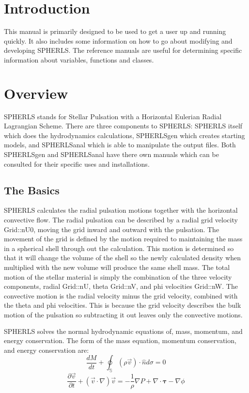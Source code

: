 \documentclass[11pt]{article}
\begin{document}
\section{Introduction}

This manual is primarily designed to be used to get a user up and running quickly. It also includes some information on how to go about modifying and developing SPHERLS. The reference manuals are useful for determining specific information about variables, functions and classes.

\section{Overview}
SPHERLS stands for Stellar Pulsation with a Horizontal Eulerian Radial Lagrangian Scheme. There are three components to SPHERLS: SPHERLS itself which does the hydrodynamics calculations, SPHERLSgen which creates starting models, and SPHERLSanal which is able to manipulate the output files. Both SPHERLSgen and SPHERLSanal have there own manuals which can be consulted for their specific uses and installations.
  
\subsection{The Basics}
SPHERLS calculates the radial pulsation motions together with the horizontal convective flow. The radial pulsation can be described by a radial grid velocity Grid::nU0, moving the grid inward and outward with the pulsation. The movement of the grid is defined by the motion required to maintaining the mass in a spherical shell through out the calculation. This motion is determined so that it will change the volume of the shell so the newly calculated density when multiplied with the new volume will produce the same shell mass. The total motion of the stellar material is simply the combination of the three velocity components, radial Grid::nU, theta Grid::nV, and phi velocities Grid::nW.  The convective motion is the radial velocity minus the grid velocity, combined with the theta and phi velocities. This is because the grid velocity describes the bulk motion of the pulsation so subtracting it out leaves only the convective motions.

SPHERLS solves the normal hydrodynamic equations of, mass, momentum, and energy conservation. The form of the mass equation, momentum conservation, and energy conservation are:
\begin{equation}
\frac{d M}{d t} + \oint_{\mathbb{S}} \left(\rho\vec v\right)\cdot\hat{n}d\sigma=0
\end{equation}
\begin{equation}
\frac{\partial \vec{v}}{\partial t}+(\vec{v}\cdot\nabla)\vec{v}=-\frac{1}{\rho}\nabla P + \nabla\cdot\mathbf{\tau}-\nabla \phi
\end{equation}
  
\end{document}
